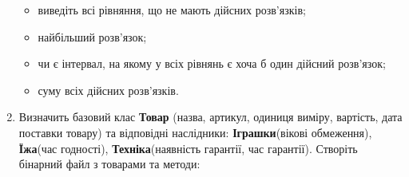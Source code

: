 \documentclass[]{article}
\begin{document}
\begin{enumerate}
  \begin{itemize}
  \item
    виведіть всі рівняння, що не мають дійсних розв'язків;
  \item
    найбільший розв'язок;
  \item
    чи є інтервал, на якому у всіх рівнянь є хоча б один дійсний
    розв'язок;
  \item
    суму всіх дійсних розв'язків.
  \end{itemize}
\item
  Визначить базовий клас \textbf{Товар} (назва, артикул, одиниця виміру,
  вартість, дата поставки товару) та відповідні наслідники:
  \textbf{Іграшки}(вікові обмеження), \textbf{Їжа}(час годності),
  \textbf{Техніка}(наявність гарантії, час гарантії). Створіть бінарний
  файл з товарами та методи:


\end{enumerate}
\end{document}
